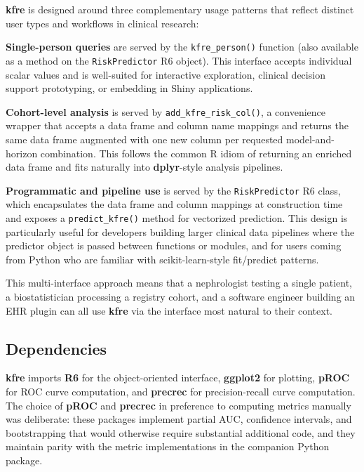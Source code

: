 \textbf{kfre} is designed around three complementary usage patterns that reflect
distinct user types and workflows in clinical research:

\textbf{Single-person queries} are served by the \texttt{kfre\_person()} function (also
available as a method on the \texttt{RiskPredictor} R6 object). This interface accepts
individual scalar values and is well-suited for interactive exploration,
clinical decision support prototyping, or embedding in Shiny applications.

\textbf{Cohort-level analysis} is served by \texttt{add\_kfre\_risk\_col()}, a convenience
wrapper that accepts a data frame and column name mappings and returns the same
data frame augmented with one new column per requested model-and-horizon
combination. This follows the common R idiom of returning an enriched data
frame and fits naturally into \textbf{dplyr}-style analysis pipelines.

\textbf{Programmatic and pipeline use} is served by the \texttt{RiskPredictor} R6 class,
which encapsulates the data frame and column mappings at construction time and
exposes a \texttt{predict\_kfre()} method for vectorized prediction. This design is
particularly useful for developers building larger clinical data pipelines where
the predictor object is passed between functions or modules, and for users
coming from Python who are familiar with scikit-learn-style fit/predict
patterns.

This multi-interface approach means that a nephrologist testing a single patient,
a biostatistician processing a registry cohort, and a software engineer building
an EHR plugin can all use \textbf{kfre} via the interface most natural to their
context.

\subsection{Dependencies}\label{dependencies}

\textbf{kfre} imports \textbf{R6} \citep{chang2021} for the object-oriented interface,
\textbf{ggplot2} \citep{wickham2016} for plotting, \textbf{pROC} \citep{robin2011} for ROC
curve computation, and \textbf{precrec} \citep{saito2015} for precision-recall curve
computation. The choice of \textbf{pROC} and \textbf{precrec} in preference to
computing metrics manually was deliberate: these packages implement partial AUC,
confidence intervals, and bootstrapping that would otherwise require substantial
additional code, and they maintain parity with the metric implementations in the
companion Python package.

